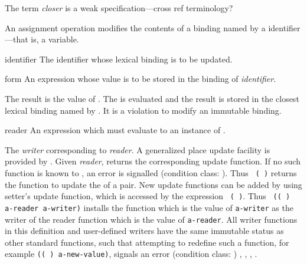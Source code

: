 %
\begin{optPrivate}
    The term {\em closer} is a weak specification---cross ref terminology?
\end{optPrivate}
%
\begin{optDefinition}
\noindent
An assignment operation modifies the contents of a
binding named by a identifier---that is, a variable.

%
\Syntax
{}%
%
\begin{arguments}
    \item[identifier] The identifier whose lexical binding is to be updated.

    \item[form] An expression whose value is to be stored in the binding of {\em
        identifier}.
\end{arguments}
%
\result%
The result is the value of .
%
\remarks%
The  is evaluated and the result is stored in the closest lexical
binding named by .  It is a violation to modify an immutable
binding.

%
\begin{arguments}
    \item[reader] An expression which must evaluate to an instance of
    .
\end{arguments}
%
\result%
The {\em writer\/} corresponding to {\em reader}.
%
\remarks%
A generalized place update facility is provided by .  Given
{\em reader},  returns the
corresponding update function.  If no such
function is known to , an error is signalled (condition
class: ).  Thus {\tt
    ( )} returns the function to update the
 of a pair.  New update functions can be added by using
{setter}'s update function, which is accessed by the expression {\tt
    ( )}.  Thus {\tt
    (( ) a-reader a-writer)} installs
the function which is the value of {\tt a-writer} as the writer of the reader
function which is the value of {\tt a-reader}.  All writer functions in this
definition and user-defined writers have the same immutable status as other
standard functions, such that attempting to redefine such a function, for
example {\tt (( ) 
    a-new-value)}, signals an error (condition class:
)
%
\seealso%
, , ,
.


\end{optDefinition}
